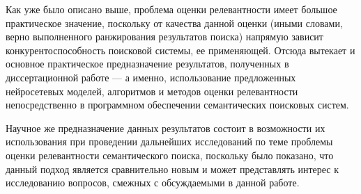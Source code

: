 Как уже было описано выше, проблема оценки релевантности имеет большое практическое значение, поскольку от качества данной оценки (иными словами,
верно выполненного ранжирования результатов поиска) напрямую зависит конкурентоспособность поисковой системы, ее применяющей. Отсюда вытекает
и основное практическое предназначение результатов, полученных в диссертационной работе --- а именно, использование предложенных нейросетевых
моделей, алгоритмов и методов оценки релевантности непосредственно в программном обеспечении семантических поисковых систем.

Научное же предназначение данных результатов состоит в возможности их использования при проведении дальнейших исследований по теме
проблемы оценки релевантности семантического поиска, поскольку было показано, что данный подход является сравнительно новым и может
представлять интерес к исследованию вопросов, смежных с обсуждаемыми в данной работе.